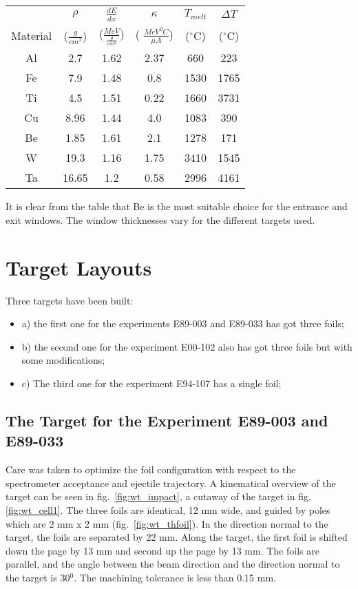 \begin{center}\begin{tabular}{|c|c|c|c|c|c|}
\hline 
&
 $\rho $&
 $\frac{dE}{dx}$&
 $\kappa $&
 $T_{melt}$&
 $\Delta T$\\
 Material &
 ($\frac{g}{cm^{2}}$) &
 ($\frac{MeV}{\frac{g}{cm^{2}}}$) &
 ( $\frac{MeV^{0}C}{\mu A}$) &
 ($^{\circ }$C) &
 ($^{\circ }$C) \\
\hline
Al &
2.7 &
1.62 &
2.37 &
660 &
223 \\
\hline
Fe &
7.9 &
1.48 &
0.8 &
1530 &
1765 \\
\hline
Ti &
4.5 &
1.51 &
0.22 &
1660 &
3731 \\
\hline
Cu &
8.96 &
1.44 &
4.0&
1083 &
390 \\
\hline
Be &
1.85 &
1.61 &
2.1 &
1278 &
171 \\
\hline
W &
19.3 &
1.16 &
1.75 &
3410 &
1545 \\
\hline
Ta &
16.65 &
1.2 &
0.58 &
2996 &
4161  \\
\hline
\end{tabular}\end{center}

It is clear from the table that Be is the most suitable choice for
the entrance and exit windows. The window thicknesses vary for the
different targets used.


\section{Target Layouts}

Three targets have been built: 

\begin{itemize}
\item a) the first one for the experiments E89-003 and E89-033 has got three
foils; 
\item b) the second one for the experiment E00-102 also has got three foils
but with some modifications; 
\item c) The third one for the experiment E94-107 has a single foil; 
\end{itemize}

\subsection{The Target for the Experiment E89-003 and E89-033}

Care was taken to optimize the foil configuration with respect to
the spectrometer acceptance and ejectile trajectory. A kinematical
overview of the target can be seen in fig.~\ref{fig:wt_impact}, a cutaway
of the target in fig.\ref{fig:wt_cell1}. The three foils are identical,
12 mm wide, and guided by poles which are 2 mm x 2 mm (fig.~\ref{fig:wt_thfoil}).
In the direction normal to the target, the foils are separated by
22 mm. Along the target, the first foil is shifted down the page by
13 mm and second up the page by 13 mm. The foils are parallel, and
the angle between the beam direction and the direction normal to the
target is 30$^{0}$. The machining tolerance is less than 0.15 mm.


